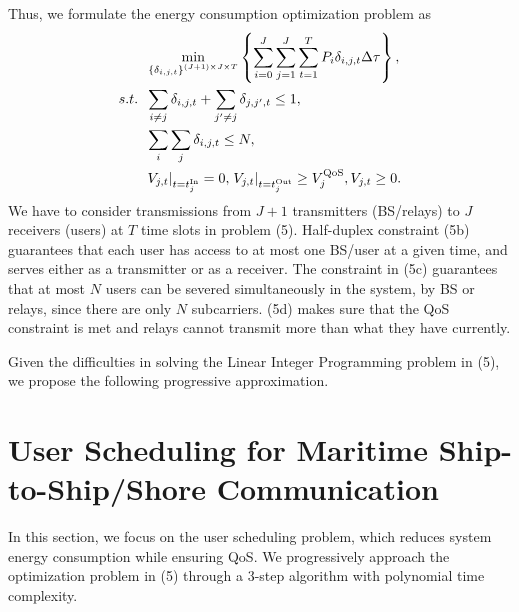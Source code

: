 \documentclass[conference]{IEEEtran}
\begin{document}
 Thus, we formulate the energy consumption optimization problem as
 \begin{subequations}
 \begin{align}
 & \mathop {\min }\limits_{{\left\{ {{\delta _{i,j,t}}} \right\}^{\left( {J + 1} \right) \times J \times T}}} \left\{ {\sum\limits_{i = 0}^J {\sum\limits_{j = 1}^J {\sum\limits_{t = 1}^{T} {{P_{i}}\delta _{i,j,t} \Delta \tau } } } } \right\} ,\\
  {s.t.} \;\; &\sum\limits_{i \ne j} {{{\delta _{i,j,t}}} } + \sum\limits_{j' \ne j} { {{\delta _{j,j',t}}} \le {1}} ,\\
  \;\;\;\;\;\; &\sum\limits_i {\sum\limits_j { {{\delta _{i,j,t}}} } } \le N ,\\
  \;\;\;\;\;\; &{{{\left. {{V_{j,t}}} \right|}_{t = t_j^{{\rm{In}}}}} = 0, \left. {{V_{j,t}}} \right|_{t = t_j^{{\rm{Out}}}}} \ge V_j^{\rm{QoS}}, {V_{j,t}} \ge 0.
 \end{align}
 \end{subequations}
 We have to consider transmissions from ${J + 1}$ transmitters (BS/relays) to $J$ receivers (users) at $T$ time slots in problem (5). 
 Half-duplex constraint (5b) guarantees that each user has access to at most one BS/user at a given time, and serves either as a transmitter or as a receiver. The constraint in (5c) guarantees that at most $N$ users can be severed simultaneously in the system, by BS or relays, since there are only $N$ subcarriers. (5d) makes sure that the QoS constraint is met and relays cannot transmit more than what they have currently.
 
 Given the difficulties in solving the Linear Integer Programming problem in (5), we propose the following progressive approximation. 
 
 
 \section{User Scheduling for Maritime Ship-to-Ship/Shore Communication}\label{sec:3}
 
 In this section, we focus on the user scheduling problem, which reduces system energy consumption while ensuring QoS. We progressively approach the optimization problem in (5) through a 3-step algorithm with polynomial time complexity.
 
\end{document}
